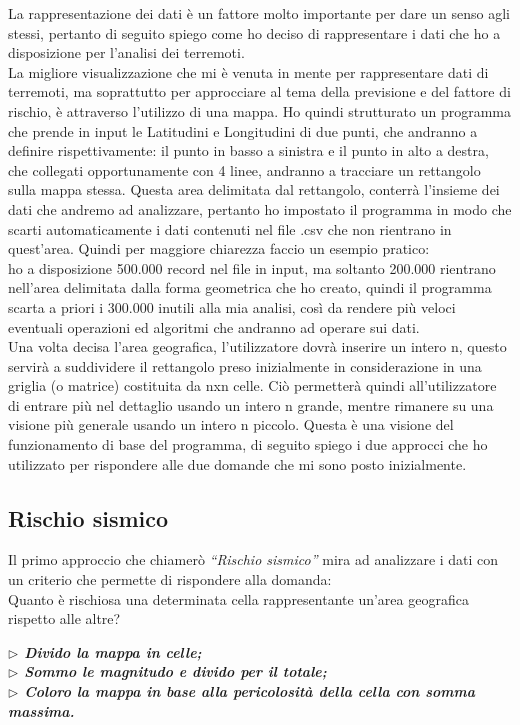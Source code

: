 La rappresentazione dei dati \`e un fattore molto importante per dare un senso agli stessi, pertanto di seguito spiego come ho deciso di rappresentare i dati che ho a disposizione per l'analisi dei terremoti.\\
La migliore visualizzazione che mi \`e venuta in mente per rappresentare dati di terremoti, ma soprattutto per approcciare al tema della previsione e del fattore di rischio, \`e attraverso l'utilizzo di una mappa. Ho quindi strutturato un programma che prende in input le Latitudini e Longitudini di due punti, che andranno a definire rispettivamente: il punto in basso a sinistra e il punto in alto a destra, che collegati opportunamente con 4 linee, andranno a tracciare un rettangolo sulla mappa stessa. Questa area delimitata dal rettangolo, conterr\`a l'insieme dei dati che andremo ad analizzare, pertanto ho impostato il programma in modo che scarti automaticamente i dati contenuti nel file .csv che non rientrano in quest'area. Quindi per maggiore chiarezza faccio un esempio pratico:\\ ho a disposizione 500.000 record nel file in input, ma soltanto 200.000 rientrano nell'area delimitata dalla forma geometrica che ho creato, quindi il programma scarta a priori i 300.000 inutili alla mia analisi, cos\`i da rendere pi\`u veloci eventuali operazioni ed algoritmi che andranno ad operare sui dati.\\
Una volta decisa l'area geografica, l'utilizzatore dovr\`a inserire un intero n, questo servir\`a a suddividere il rettangolo preso inizialmente in considerazione in una griglia (o matrice) costituita da nxn celle. Ci\`o permetter\`a quindi all'utilizzatore di entrare pi\`u nel dettaglio usando un intero n grande, mentre rimanere su una visione pi\`u generale usando un intero n piccolo. Questa \`e una visione del funzionamento di base del programma, di seguito spiego i due approcci che ho utilizzato per rispondere alle due domande che mi sono posto inizialmente.

\subsection{Rischio sismico}\label{rischioSismico}
Il primo approccio che chiamer\`o \textit{``Rischio sismico''} mira ad analizzare i dati con un criterio che permette di rispondere alla domanda:\\
Quanto \`e rischiosa una determinata cella rappresentante un'area geografica rispetto alle altre?

\begin{displayquote}
\textit{\textbf{$\rhd$ Divido la mappa in celle;}}\\
\textit{\textbf{$\rhd$ Sommo le magnitudo e divido per il totale;}}\\
\textit{\textbf{$\rhd$ Coloro la mappa in base alla pericolosit\`a della cella con somma massima.}}
\end{displayquote}


